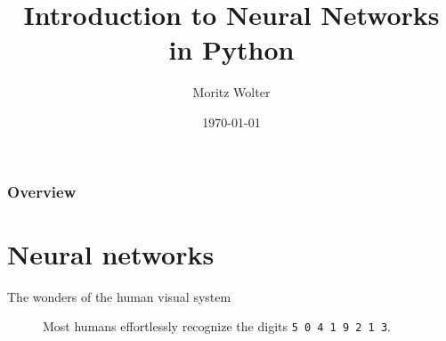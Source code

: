 \documentclass[notes]{beamer}
\title{Introduction to Neural Networks in Python}
\date{\today}
\institute{High-Performance Computing and Analytics Lab}
\author{Moritz Wolter}
\begin{document}
    \maketitle

    \begin{frame}
    \frametitle{Overview} 
    \tableofcontents
    \end{frame}

    \section{Neural networks}
    \begin{frame}{The wonders of the human visual system}
      \begin{figure}
        
        \caption{Most humans effortlessly recognize the digits \texttt{5 0 4 1 9 2 1 3}.}
      \end{figure}
    \end{frame}
\end{document}
